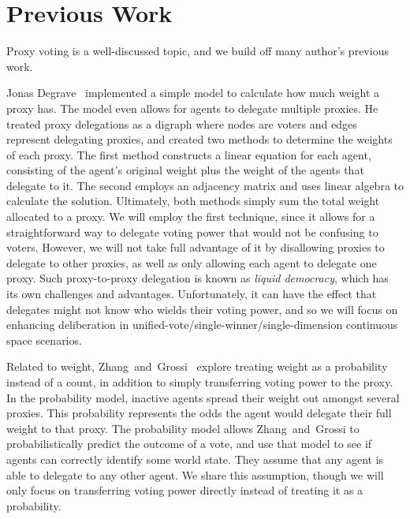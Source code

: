 \section{Previous Work}\label{sec:previous-work}
Proxy voting is a well-discussed topic, and we build off many author's previous work.

Jonas Degrave~\cite{Degrave2014} implemented a simple model to calculate how much
weight a proxy has.
The model even allows for agents to delegate multiple proxies.
He treated proxy delegations as a digraph where nodes are voters and edges represent
delegating proxies, and created two methods to determine the weights of each proxy.
The first method constructs a linear equation for each agent, consisting of the
agent's original weight plus the weight of the agents that delegate to it.
The second employs an adjacency matrix and uses linear algebra to calculate the
solution.
Ultimately, both methods simply sum the total weight allocated to a proxy.
We will employ the first technique, since it allows for a straightforward way to
delegate voting power that would not be confusing to voters.
However, we will not take full advantage of it by disallowing proxies to delegate to
other proxies, as well as only allowing each agent to delegate one proxy.
Such proxy-to-proxy delegation is known as \textit{liquid democracy}, which has its own
challenges and advantages.
Unfortunately, it can have the effect that delegates might not know who wields their
voting power, and so we will focus on enhancing deliberation in
unified-vote/single-winner/single-dimension continuous space scenarios.

Related to weight, Zhang~and~Grossi~\cite{Zhang2022} explore treating weight as a
probability instead of a count, in addition to simply transferring voting power to
the proxy.
In the probability model, inactive agents spread their weight out amongst several
proxies.
This probability represents the odds the agent would delegate their full weight to that
proxy.
The probability model allows Zhang~and~Grossi to probabilistically predict the
outcome of a vote, and use that model to see if agents can correctly identify some
world state.
They assume that any agent is able to delegate to any other agent.
We share this assumption, though we will only focus on transferring voting power
directly instead of treating it as a probability.

